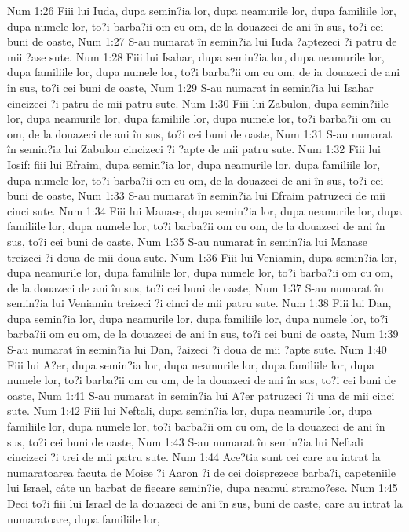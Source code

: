Num 1:26  Fiii lui Iuda, dupa semin?ia lor, dupa neamurile lor, dupa familiile lor, dupa numele lor, to?i barba?ii om cu om, de la douazeci de ani în sus, to?i cei buni de oaste,
Num 1:27  S-au numarat în semin?ia lui Iuda ?aptezeci ?i patru de mii ?ase sute.
Num 1:28  Fiii lui Isahar, dupa semin?ia lor, dupa neamurile lor, dupa familiile lor, dupa numele lor, to?i barba?ii om cu om, de ia douazeci de ani în sus, to?i cei buni de oaste,
Num 1:29  S-au numarat în semin?ia lui Isahar cincizeci ?i patru de mii patru sute.
Num 1:30  Fiii lui Zabulon, dupa semin?iile lor, dupa neamurile lor, dupa familiile lor, dupa numele lor, to?i barba?ii om cu om, de la douazeci de ani în sus, to?i cei buni de oaste,
Num 1:31  S-au numarat în semin?ia lui Zabulon cincizeci ?i ?apte de mii patru sute.
Num 1:32  Fiii lui Iosif: fiii lui Efraim, dupa semin?ia lor, dupa neamurile lor, dupa familiile lor, dupa numele lor, to?i barba?ii om cu om, de la douazeci de ani în sus, to?i cei buni de oaste,
Num 1:33  S-au numarat în semin?ia lui Efraim patruzeci de mii cinci sute.
Num 1:34  Fiii lui Manase, dupa semin?ia lor, dupa neamurile lor, dupa familiile lor, dupa numele lor, to?i barba?ii om cu om, de la douazeci de ani în sus, to?i cei buni de oaste,
Num 1:35  S-au numarat în semin?ia lui Manase treizeci ?i doua de mii doua sute.
Num 1:36  Fiii lui Veniamin, dupa semin?ia lor, dupa neamurile lor, dupa familiile lor, dupa numele lor, to?i barba?ii om cu om, de la douazeci de ani în sus, to?i cei buni de oaste,
Num 1:37  S-au numarat în semin?ia lui Veniamin treizeci ?i cinci de mii patru sute.
Num 1:38  Fiii lui Dan, dupa semin?ia lor, dupa neamurile lor, dupa familiile lor, dupa numele lor, to?i barba?ii om cu om, de la douazeci de ani în sus, to?i cei buni de oaste,
Num 1:39  S-au numarat în semin?ia lui Dan, ?aizeci ?i doua de mii ?apte sute.
Num 1:40  Fiii lui A?er, dupa semin?ia lor, dupa neamurile lor, dupa familiile lor, dupa numele lor, to?i barba?ii om cu om, de la douazeci de ani în sus, to?i cei buni de oaste,
Num 1:41  S-au numarat în semin?ia lui A?er patruzeci ?i una de mii cinci sute.
Num 1:42  Fiii lui Neftali, dupa semin?ia lor, dupa neamurile lor, dupa familiile lor, dupa numele lor, to?i barba?ii om cu om, de la douazeci de ani în sus, to?i cei buni de oaste,
Num 1:43  S-au numarat în semin?ia lui Neftali cincizeci ?i trei de mii patru sute.
Num 1:44  Ace?tia sunt cei care au intrat la numaratoarea facuta de Moise ?i Aaron ?i de cei doisprezece barba?i, capeteniile lui Israel, câte un barbat de fiecare semin?ie, dupa neamul stramo?esc.
Num 1:45  Deci to?i fiii lui Israel de la douazeci de ani în sus, buni de oaste, care au intrat la numaratoare, dupa familiile lor,
